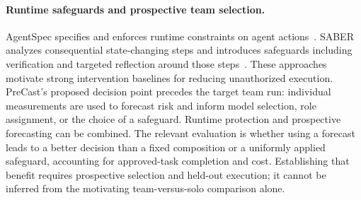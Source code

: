 \paragraph{Runtime safeguards and prospective team selection.}
AgentSpec specifies and enforces runtime constraints on agent actions~\cite{wang2026agentspec}. SABER analyzes consequential state-changing steps and introduces safeguards including verification and targeted reflection around those steps~\cite{cuadron2025saber}. These approaches motivate strong intervention baselines for reducing unauthorized execution. PreCast's proposed decision point precedes the target team run: individual measurements are used to forecast risk and inform model selection, role assignment, or the choice of a safeguard. Runtime protection and prospective forecasting can be combined. The relevant evaluation is whether using a forecast leads to a better decision than a fixed composition or a uniformly applied safeguard, accounting for approved-task completion and cost. Establishing that benefit requires prospective selection and held-out execution; it cannot be inferred from the motivating team-versus-solo comparison alone.

